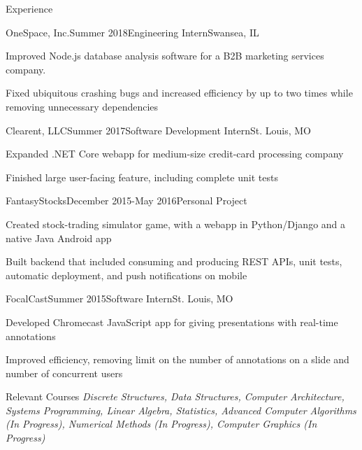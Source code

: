 \documentclass{resume} %
\begin{document}
            \begin{rSection}{Experience}
                \begin{rSubsection}{OneSpace, Inc.}{Summer 2018}{Engineering Intern}{Swansea, IL}
                \item Improved Node.js database analysis software for a B2B marketing services company. 
                \item Fixed ubiquitous crashing bugs and increased efficiency by up to two times while removing unnecessary dependencies
                \end{rSubsection}


                \begin{rSubsection}{Clearent, LLC}{Summer 2017}{Software Development Intern}{St. Louis, MO}
                \item Expanded .NET Core webapp for medium-size credit-card processing company
                \item Finished large user-facing feature, including complete unit tests
                \end{rSubsection}

                \begin{rSubsection}{FantasyStocks}{December 2015-May 2016}{Personal Project}{}
                \item Created stock-trading simulator game, with a webapp in Python/Django and a native Java Android app
                \item Built backend that included consuming and producing REST APIs, unit tests, automatic deployment, and push notifications on mobile
                \end{rSubsection}


                \begin{rSubsection}{FocalCast}{Summer 2015}{Software Intern}{St. Louis, MO}{}
                \item Developed Chromecast JavaScript app for giving presentations with real-time annotations
                \item Improved efficiency, removing limit on the number of annotations on a slide and number of concurrent users
                \end{rSubsection}

            \end{rSection}


    \begin{rSection}{Relevant Courses}
        \textit{Discrete Structures, Data Structures, Computer Architecture, Systems Programming, Linear Algebra, Statistics, Advanced Computer Algorithms (In Progress), Numerical Methods (In Progress), Computer Graphics (In Progress)}

    \end{rSection}
\end{document}
